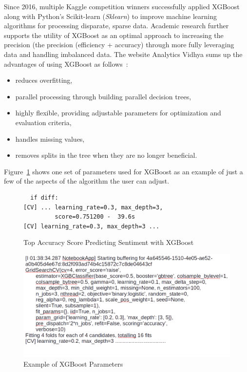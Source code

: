 Since 2016, multiple Kaggle competition winners successfully applied
XGBoost along with Python’s Scikit-learn (\emph{Sklearn}) to improve
machine learning algorithms for processing disparate, sparse data.
Academic research further supports the utility of XGBoost as an
optimal approach to increasing the precision (the precision
(efficiency + accuracy) through more fully leveraging data and
handling imbalanced data.  The website Analytics Vidhya sums up the
advantages of using XGBoost as follows~\cite{jain2016}:

\begin{itemize}
\item reduces overfitting,
\item parallel processing through building parallel decision trees,
\item highly flexible, providing adjustable parameters for
  optimization and evaluation criteria,
\item handles missing values,
\item removes splits in the tree when they are no longer beneficial. 
\end{itemize}

Figure~\ref{F:output} shows one set of parameters used for XGBoost as
an example of just a few of the aspects of the algorithm the user can
adjust.

\begin{figure}[H]
\begin{verbatim}
  if diff:
[CV] ... learning_rate=0.3, max_depth=3, 
         score=0.751200 -  39.6s
[CV] learning_rate=0.3, max_depth=3 ...
\end{verbatim}
\caption{Top Accuracy Score Predicting Sentiment with XGBoost}\label{F:output}
\end{figure}

\begin{figure}[H]
\centering
\includegraphics[width=\columnwidth]{images/xgb_params.png}
\caption{Example of XGBoost Parameters}
\label{fig:xgb_params}
\end{figure} 

